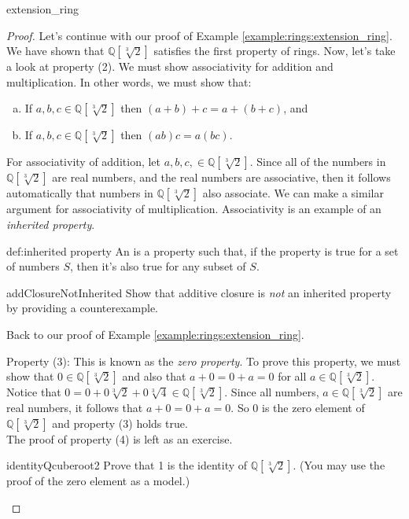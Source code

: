 \begin{example}{extension_ring}
\begin{proof}
Let's continue with our proof of Example \ref{example:rings:extension_ring}. We have shown that ${\mathbb Q}[\sqrt[3]{2}]$ satisfies the first property of rings. Now, let's take a look at property (2). We must show associativity for addition and multiplication. In other words, we must show that:
\begin{enumerate}[(a)]
\item If $a,b,c\in{\mathbb Q}[\sqrt[3]{2}]$ then $(a+b)+c=a+(b+c)$, and
\item If $a,b,c\in{\mathbb Q}[\sqrt[3]{2}]$ then $(ab)c=a(bc)$.
\end{enumerate}

For associativity of addition, let $a,b,c,\in{\mathbb Q}[ \sqrt[3]{2}]$. Since all of the numbers in ${\mathbb Q}[\sqrt[3]{2}]$ are real numbers, and the real numbers are associative, then it follows automatically that numbers in ${\mathbb Q}[\sqrt[3]{2}]$ also associate.  We can make a similar argument for associativity of multiplication.  Associativity is an example of an \emph{inherited property}.

\begin{defn}{def:inherited property}
An  is a property such that, if the property is true for a set of numbers $S$, then it's also true for any subset of $S$.
\end{defn}

\begin{exercise}{addClosureNotInherited}
Show that additive closure is \emph{not} an inherited property by providing a counterexample.
\end{exercise}{}

Back to our proof of Example \ref{example:rings:extension_ring}.

Property (3): This is known as the \emph{zero property}. To prove this property, we must show that $0\in{\mathbb Q}[\sqrt[3]{2}]$ and also that $a+0=0+a=0$ for all $a\in{\mathbb Q}[\sqrt[3]{2}]$. Notice that $0=0+0\sqrt[3]{2}+0\sqrt[3]{4}\in{\mathbb Q}[\sqrt[3]{2}]$. Since all numbers, $a\in{\mathbb Q}[\sqrt[3]{2}]$ are real numbers, it follows that $a+0=0+a=0$. So $0$ is the zero element of ${\mathbb Q}[\sqrt[3]{2}]$ and property (3) holds true.\\

The proof of property (4) is left as an exercise.

\begin{exercise}{identityQcuberoot2}
Prove that 1 is the identity of ${\mathbb Q}[\sqrt[3]{2}]$. (You may use the proof of the zero element as a model.)  
\end{exercise}{}


\end{proof}
\end{example}

